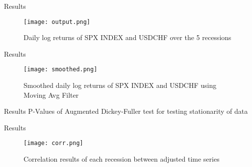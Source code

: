 \documentclass[11pt]{beamer}
\begin{document}
\begin{frame}{Results}
\begin{figure}[h]
\caption{Daily log returns of SPX INDEX and USDCHF over the 5 recessions}
\centering
\texttt{[image: output.png]}
\end{figure}
\end{frame}
\begin{frame}{Results}
\begin{figure}[h]
\caption{Smoothed daily log returns of SPX INDEX and USDCHF using Moving Avg Filter}
\centering
\texttt{[image: smoothed.png]}
\end{figure}
\end{frame}

\begin{frame}{Results}
P-Values of Augmented Dickey-Fuller test for testing stationarity of data
\begin{table}[h!]
\centering
{}
\end{table}
\end{frame}

\begin{frame}{Results}
\begin{figure}[h]
\caption{Correlation results of each recession between adjusted time series}
\centering
\texttt{[image: corr.png]}
\end{figure}
\end{frame}
\end{document}
